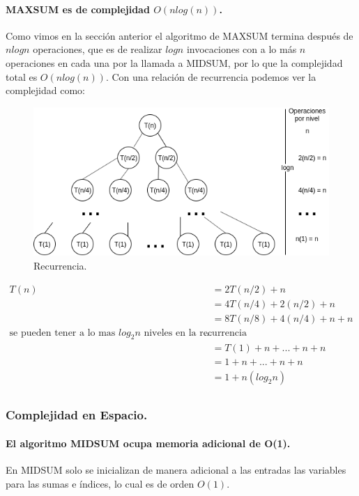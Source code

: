 \documentclass[12pt]{article}
\begin{document}
\paragraph{MAXSUM es de complejidad $O(nlog(n))$.} Como vimos en la sección anterior el algoritmo de MAXSUM termina después de $nlogn$ operaciones, que es de realizar $logn$ invocaciones con a lo más $n$ operaciones en cada una por la llamada a MIDSUM, por lo que la complejidad total es $O(nlog(n))$.
Con una relación de recurrencia podemos ver la complejidad como:
\begin{figure}[h]
	\begin{center}
		\includegraphics[scale=0.8]{recurrencia}
	\end{center}
	\caption{Recurrencia.}
\end{figure}

\begin{equation}
\begin{split}
T(n) & = 2T(n/2) + n \\
	& = 4T(n/4) + 2(n/2) + n \\
	& = 8T(n/8) + 4(n/4) + n + n \\
	\text{se pueden tener a lo mas $log_2n$ niveles en la recurrencia}... & \\
	& = T(1) + n + ... + n + n \\
	& = 1 + n + ... + n + n \\
	& = 1 + n(log_2n) \\
\end{split}
\end{equation}
\subsubsection{Complejidad en Espacio.}
\paragraph{El algoritmo MIDSUM ocupa memoria adicional de O(1).} En MIDSUM solo se inicializan de manera adicional a las entradas las variables para las sumas e índices, lo cual es de orden $O(1)$.
\end{document}
